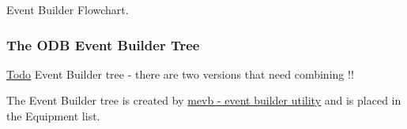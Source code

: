 \begin{center} Event Builder Flowchart.  \end{center} 

\label{FE_Event_Builder_idx_ODB_tree_event-builder}
\hypertarget{FE_Event_Builder_idx_ODB_tree_event-builder}{}




 \hypertarget{FE_Event_Builder_FE_ODB_EBuilder_Tree}{}\subsubsection{The ODB Event Builder Tree}\label{FE_Event_Builder_FE_ODB_EBuilder_Tree}
\begin{Desc}
\item[\hyperlink{todo__todo000001}{Todo}]Event Builder tree -\/ there are two versions that need combining !!\end{Desc}
The Event Builder tree is created by \hyperlink{FE_Event_Builder_FE_mevb_utility}{mevb -\/ event builder utility} and is placed in the Equipment list.



